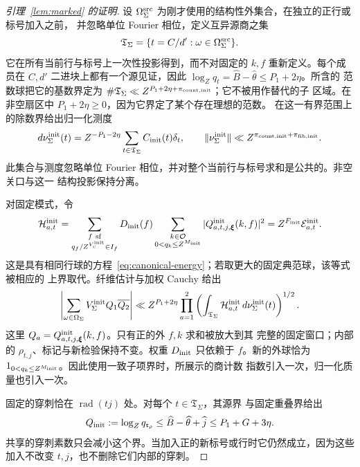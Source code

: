 \documentclass[11pt,a4paper]{article}
\numberwithin{equation}{section}
\numberwithin{figure}{section}
\theoremstyle{definition}
\theoremstyle{remark}
\begin{document}
\begin{proof}[引理~\ref{lem:marked} 的证明]
设 \(\Omega_\Sigma^{\rm src}\) 为刚才使用的结构性外集合，在独立的正行或标号加入之前，
并忽略单位 Fourier 相位，定义互异源商之集
\[
 \mathfrak T_\Sigma=\{t=C/d':\omega\in\Omega_\Sigma^{\rm src}\}.
\]
它在所有当前行与标号上一次性投影得到，而不对固定的 \(k,f\) 重新定义。每个成员在 \(C,d'\)
二进块上都有一个源见证，因此 \(\log_Zq_t=\widehat B-\widehat\theta\le P_1+2\eta\)。所含的
范数球把它的基数界定为
\(\#\mathfrak T_\Sigma\ll Z^{P_1+2\eta+\pi_{{\rm count},{\rm init}}}\)；它不被用作替代的子
区域。在非空扇区中 \(P_1+2\eta\ge0\)，因为它界定了某个存在理想的范数。
在这一有界范围上的除数界给出归一化测度
\begin{equation}\label{eq:initial-normalized-quotients}
 d\nu_\Sigma^{\rm init}(t)
 =Z^{-P_1-2\eta}\sum_{t\in\mathfrak T_\Sigma}C_{\rm init}(t)\delta_t,
 \qquad
 \|\nu_\Sigma^{\rm init}\|
 \ll Z^{\pi_{{\rm count},{\rm init}}+\pi_{{\rm fib},{\rm init}}}.
\end{equation}
此集合与测度忽略单位 Fourier 相位，并对整个当前行与标号求和是公共的。非空关口与这一
结构投影保持分离。

对固定模式，令
\begin{equation}\label{eq:initial-positive-child}
 \mathcal H_{a,t}^{\rm init}
 =\sum_{\substack{f\ {\rm sf}\\q_f/Z^{V_c^{\rm init}}\in I_f}}
 D_{\rm init}(f)\sum_{\substack{k\in\mathcal O\\0<q_k\le Z^{M_{\rm init}}}}
 |Q^{\rm init}_{a,t,j,\boldsymbol\xi}(k,f)|^2
 =Z^{F_{\rm init}}\mathcal E_{a,t}^{\rm init}.
\end{equation}
这是具有相同行球的方程~\eqref{eq:canonical-energy}；若取更大的固定典范球，该等式被相应的
上界取代。纤维估计与加权 Cauchy 给出
\begin{equation}\label{eq:initial-weighted-count}
 \left|\sum_{\omega\in\Omega_\Sigma}V_\Sigma^{\rm init}Q_1\overline{Q_2}\right|
 \ll Z^{P_1+2\eta}
 \prod_{a=1}^2
 \left(\int_{\mathfrak T_\Sigma}\mathcal H_{a,t}^{\rm init}
                         \,d\nu_\Sigma^{\rm init}(t)\right)^{1/2}.
\end{equation}
这里 \(Q_a=Q^{\rm init}_{a,t,j,\boldsymbol\xi}(k,f)\)。只有正的外 \(f,k\) 求和被放大到其
完整的固定窗口；内部的 \(\rho_{t,j}\)、标记与新检验保持不变。权重 \(D_{\rm init}\) 只依赖于
\(f\)。新的外球恰为 \(1_{0<q_k\le Z^{M_{\rm init}}}\)。因此使用一致子项界时，所展示的商计数
指数引入一次，归一化质量也引入一次。

固定的穿刺恰在 \(\operatorname{rad}(tj)\) 处。对每个 \(t\in\mathfrak T_\Sigma\)，其源界
与固定重叠界给出
\begin{equation}\label{old-eq:4.13}
 Q_{\rm init}:=\log_Zq_{\mathfrak r_\rho}
 \le\widehat B-\widehat\theta+\widehat j\le P_1+G+3\eta.
\end{equation}
共享的穿刺素数只会减小这个界。当加入正的新标号或行时它仍然成立，因为这些加入不改变
\(t,j\)，也不删除它们内部的穿刺。


\end{proof}
\end{document}
